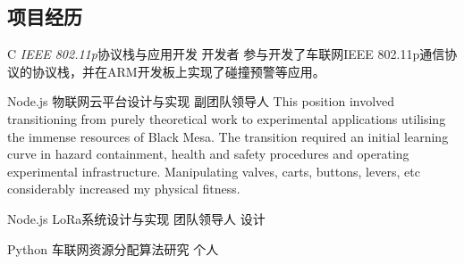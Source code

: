\documentclass[10pt]{article} %
\begin{document}
\begin{paracol}{2}
	\section{项目经历}
	
	
	
	
	
	{C} %
	{\textit{IEEE 802.11p}协议栈与应用开发} %
	{开发者} %
	{参与开发了车联网IEEE 802.11p通信协议的协议栈，并在ARM开发板上实现了碰撞预警等应用。}
	
	
	{Node.js} %
	{物联网云平台设计与实现} %
	{副团队领导人} %
	{This position involved transitioning from purely theoretical work to experimental applications utilising the immense resources of Black Mesa. The transition required an initial learning curve in hazard containment, health and safety procedures and operating experimental infrastructure. Manipulating valves, carts, buttons, levers, etc considerably increased my physical fitness.}  %
	
	{Node.js} %
	{LoRa系统设计与实现} %
	{团队领导人} %
	{设计}  %
	
	{Python} %
	{车联网资源分配算法研究} %
	{个人} %
	{} %
	
	
	\vspace{-\baselineskip}\medskip %
	
	

\end{paracol}
\end{document}
